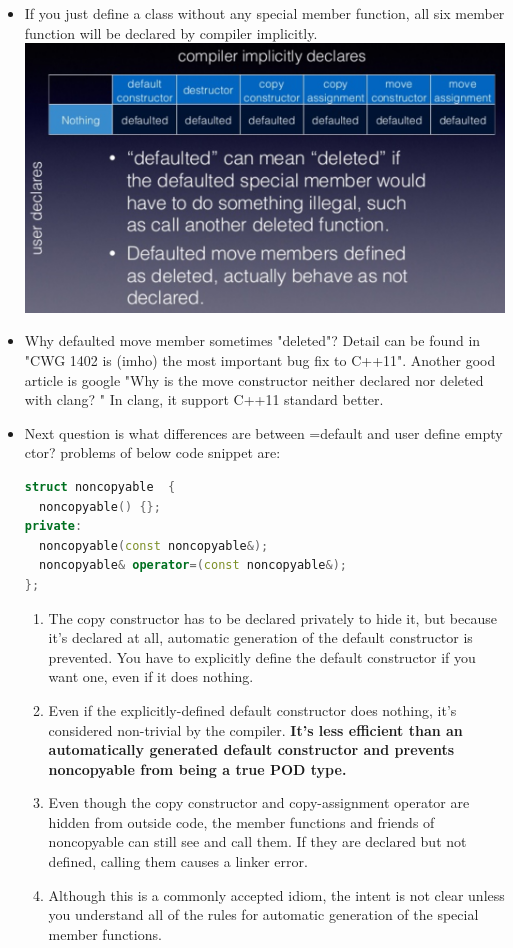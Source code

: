 \documentclass[a4paper,12pt,twoside]{book}
\begin{document}
\begin{itemize}
\item If you just define a class without any special member function, all six member function will be declared by compiler implicitly. \\
\includegraphics[scale=0.6]{pics/sm2.png} \newline

\item Why defaulted move member sometimes "deleted"? Detail can be found in "CWG 1402 is (imho) the most important bug fix to C++11". Another good article is google "Why is the move constructor neither declared nor deleted with clang? " In clang, it support C++11 standard better. 


\item Next question is what differences are between =default and user define empty ctor? problems of below code snippet are:
\begin{lstlisting}[frame=single, language=c++]
struct noncopyable  {
  noncopyable() {};
private:
  noncopyable(const noncopyable&);
  noncopyable& operator=(const noncopyable&);
};
\end{lstlisting}
\begin{enumerate}
\item The copy constructor has to be declared privately to hide it, but because it's declared at all, automatic generation of the default constructor is prevented. You have to explicitly define the default constructor if you want one, even if it does nothing.
\item Even if the explicitly-defined default constructor does nothing, it's considered non-trivial by the compiler. \textbf{It's less efficient than an automatically generated default constructor and prevents noncopyable from being a true POD type.}
\item Even though the copy constructor and copy-assignment operator are hidden from outside code, the member functions and friends of noncopyable can still see and call them. If they are declared but not defined, calling them causes a linker error.
\item Although this is a commonly accepted idiom, the intent is not clear unless you understand all of the rules for automatic generation of the special member functions.
\end{enumerate}



\end{itemize}
\end{document}
